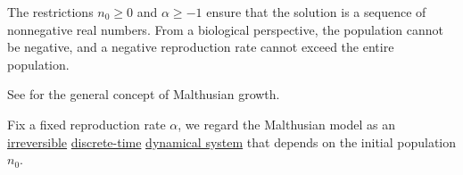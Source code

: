 \begin{comments}
  \item The restrictions \( n_0 \geq 0 \) and \( \alpha \geq -1 \) ensure that the solution is a sequence of nonnegative real numbers. From a biological perspective, the population cannot be negative, and a negative reproduction rate cannot exceed the entire population.

  See  for the general concept of Malthusian growth.

  \item Fix a fixed reproduction rate \( \alpha \), we regard the Malthusian model as an \hyperref[def:reversible_dynamical_system]{irreversible} \hyperref[def:discrete_dynamical_system]{discrete-time} \hyperref[def:dynamical_system]{dynamical system} that depends on the initial population \( n_0 \).
\end{comments}

